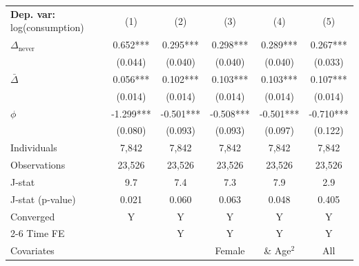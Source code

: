 \begin{tabular}{l ccccc} \toprule  \textbf{Dep. var:}  log(consumption) 
                    &\multicolumn{1}{c}{(1)}   &\multicolumn{1}{c}{(2)}   &\multicolumn{1}{c}{(3)}   &\multicolumn{1}{c}{(4)}   &\multicolumn{1}{c}{(5)}   \\

\addlinespace
$\Delta_{\text{never}}$&       0.652***&       0.295***&       0.298***&       0.289***&       0.267***\\
                    &     (0.044)   &     (0.040)   &     (0.040)   &     (0.040)   &     (0.033)   \\

\addlinespace
$\bar{\Delta}$      &       0.056***&       0.102***&       0.103***&       0.103***&       0.107***\\
                    &     (0.014)   &     (0.014)   &     (0.014)   &     (0.014)   &     (0.014)   \\

\addlinespace
$\phi$              &      -1.299***&      -0.501***&      -0.508***&      -0.501***&      -0.710***\\
                    &     (0.080)   &     (0.093)   &     (0.093)   &     (0.097)   &     (0.122)   \\
\addlinespace
Individuals         &       7,842   &       7,842   &       7,842   &       7,842   &       7,842   \\
Observations        &      23,526   &      23,526   &      23,526   &      23,526   &      23,526   \\
J-stat              &         9.7   &         7.4   &         7.3   &         7.9   &         2.9   \\
J-stat (p-value)    &       0.021   &       0.060   &       0.063   &       0.048   &       0.405   \\
Converged           &           Y   &           Y   &           Y   &           Y   &           Y   \\
\cmidrule{2-6} Time FE & & Y & Y & Y & Y \\ Covariates & & & Female & \& Age$^2$ & All \\ \bottomrule \end{tabular}
